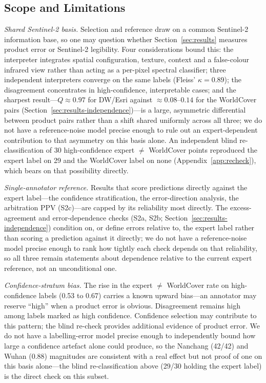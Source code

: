 \documentclass[remotesensing,article,submit,moreauthors]{Definitions/mdpi}
\begin{document}
\subsection{Scope and Limitations}\label{sec:disc-scope}

\emph{Shared Sentinel-2 basis.} Selection and reference draw on a common
Sentinel-2 information base, so one may question whether Section~\ref{sec:results}
measures product error or Sentinel-2 legibility. Four considerations bound
this: the interpreter integrates spatial configuration, texture, context and a
false-colour infrared view rather than acting as a per-pixel spectral
classifier; three independent interpreters converge on the same labels
(Fleiss' $\kappa = 0.89$); the disagreement concentrates in high-confidence,
interpretable cases; and the sharpest
result---$Q \approx 0.97$ for DW/Esri against $\approx 0.08$--$0.14$ for the WorldCover
pairs (Section~\ref{sec:results-independence})---is a large, asymmetric
differential between product pairs rather than a shift shared uniformly
across all three; we do not have a reference-noise model precise enough to
rule out an expert-dependent contribution to that asymmetry on this basis
alone. An independent blind re-classification of 30 high-confidence
expert $\neq$ WorldCover points reproduced the expert label on 29 and the
WorldCover label on none (Appendix~\ref{app:recheck}), which bears on that
possibility directly.

\emph{Single-annotator reference.} Results that score predictions directly
against the expert label---the confidence stratification, the error-direction
analysis, the arbitration PPV (S2c)---are capped by its reliability most
directly. The excess-agreement and error-dependence checks (S2a, S2b;
Section~\ref{sec:results-independence}) condition on, or define errors
relative to, the expert label rather than scoring a prediction against it
directly; we do not have a reference-noise model precise enough to rank how
tightly each check depends on that reliability, so all three remain
statements about dependence relative to the current expert reference, not an
unconditional one.

\emph{Confidence-stratum bias.} The rise in the expert $\neq$ WorldCover rate
on high-confidence labels (0.53 to 0.67) carries a known upward bias---an
annotator may reserve ``high'' when a product error is obvious. Disagreement
remains high among labels marked as high confidence. Confidence selection may
contribute to this pattern; the blind re-check provides additional evidence
of product error. We do not have a labelling-error model precise
enough to independently bound how large a confidence artefact alone could
produce, so the Nanchang (42/42) and Wuhan (0.88) magnitudes are consistent
with a real effect but not proof of one on this basis alone---the blind
re-classification above (29/30 holding the expert label) is the direct check
on this subset.
\end{document}

